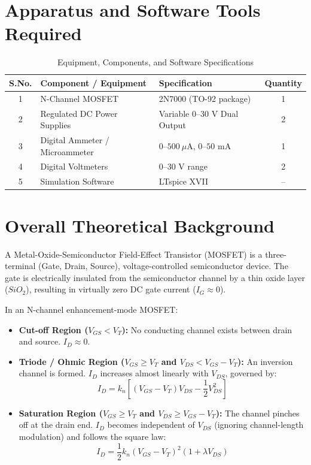\documentclass[11pt,a4paper]{article}
\begin{document}
\section{Apparatus and Software Tools Required}
\begin{table}[H]
\centering
\caption{Equipment, Components, and Software Specifications}
\begin{tabular}{cllc}
\toprule
\textbf{S.No.} & \textbf{Component / Equipment} & \textbf{Specification} & \textbf{Quantity} \\
\midrule
1 & N-Channel MOSFET & 2N7000 (TO-92 package) & 1 \\
2 & Regulated DC Power Supplies & Variable $0\text{--}30\text{ V}$ Dual Output & 2 \\
3 & Digital Ammeter / Microammeter & $0\text{--}500\ \mu\text{A}$, $0\text{--}50\text{ mA}$ & 1 \\
4 & Digital Voltmeters & $0\text{--}30\text{ V}$ range & 2 \\
5 & Simulation Software & LTspice XVII & -- \\
\bottomrule
\end{tabular}
\end{table}

\section{Overall Theoretical Background}
A Metal-Oxide-Semiconductor Field-Effect Transistor (MOSFET) is a three-terminal (Gate, Drain, Source), voltage-controlled semiconductor device. The gate is electrically insulated from the semiconductor channel by a thin oxide layer ($SiO_2$), resulting in virtually zero DC gate current ($I_G \approx 0$).

In an N-channel enhancement-mode MOSFET:
\begin{itemize}
    \item \textbf{Cut-off Region ($V_{GS} < V_T$):} No conducting channel exists between drain and source. $I_D \approx 0$.
    \item \textbf{Triode / Ohmic Region ($V_{GS} \ge V_T$ and $V_{DS} < V_{GS} - V_T$):} An inversion channel is formed. $I_D$ increases almost linearly with $V_{DS}$, governed by:
    \begin{equation}
        I_D = k_n \left[ (V_{GS} - V_T) V_{DS} - \frac{1}{2} V_{DS}^2 \right]
    \end{equation}
    \item \textbf{Saturation Region ($V_{GS} \ge V_T$ and $V_{DS} \ge V_{GS} - V_T$):} The channel pinches off at the drain end. $I_D$ becomes independent of $V_{DS}$ (ignoring channel-length modulation) and follows the square law:
    \begin{equation}
        I_D = \frac{1}{2} k_n (V_{GS} - V_T)^2 (1 + \lambda V_{DS})
    \end{equation}
\end{itemize}
\end{document}
